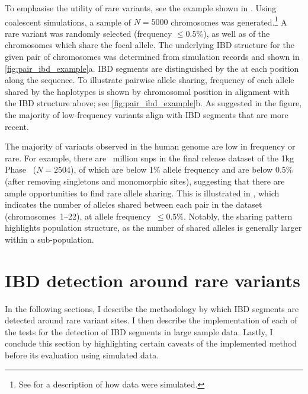 To emphasise the utility of rare variants, see the example shown in .
Using coalescent simulations, a sample of ${N = \num{5000}}$ chromosomes was generated.\footnote{See  for a description of how data were simulated.}
A rare variant was randomly selected (frequency $\leq 0.5\%$), as well as  of the chromosomes which share the focal allele.
The underlying IBD structure for the given pair of chromosomes was determined from simulation records and shown in \cref{fig:pair_ibd_example}{a}.
IBD segments are distinguished by the  at each position along the sequence.
To illustrate pairwise allele sharing,  frequency of each allele shared by the  haplotypes is shown by chromosomal position in alignment with the IBD structure above; see \cref{fig:pair_ibd_example}{b}.
As suggested in the figure, the majority of low-frequency variants align with IBD segments that are more recent.

%

%

The majority of variants observed in the human genome are low in frequency or rare.
For example, there are ~million \glspl{snp} in the final release dataset of the \gls{1kg} Phase~ (${N = \num{2504}}$), of which  are below 1\% allele frequency and  are below 0.5\% (after removing singletons and monomorphic sites), suggesting that there are ample opportunities to find rare allele sharing.
This is illustrated in , which indicates the number of alleles shared between each pair in the dataset (chromosomes~1--22), at allele frequency~${\leq 0.5\%}$.
Notably, the sharing pattern highlights population structure, as the number of shared alleles is generally larger within a sub-population.



%
\section{IBD detection around rare variants}
\label{sec:tidy}
%

In the following sections, I describe the methodology by which IBD segments are detected around rare variant sites.
I then describe the implementation of each of the  tests for the detection of IBD segments in large sample data.
Lastly, I conclude this section by highlighting certain caveats of the implemented method before its evaluation using simulated data.


